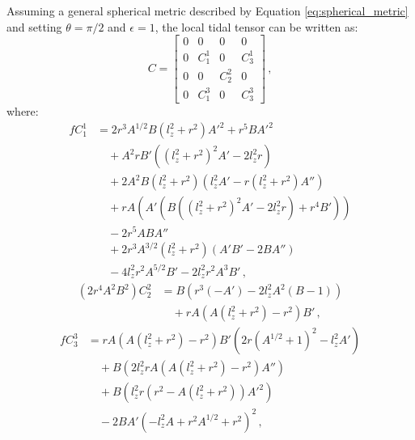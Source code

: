 \documentclass[11pt, twocolumn]{article}
\begin{document}
Assuming a general spherical metric described by Equation \ref{eq:spherical_metric} and setting $\theta = \pi/2$ and $\epsilon = 1$, the local tidal tensor can be written as:
\begin{equation}
    C =
    \begin{bmatrix}
        0 & 0         & 0         & 0         \\
        0 & C^{1}_{1} & 0         & C^{1}_{3} \\
        0 & 0         & C^{2}_{2} & 0         \\
        0 & C^{3}_{1} & 0         & C^{3}_{3}
    \end{bmatrix} \, ,
\end{equation}
where:
\begin{equation}
    \begin{split}
        f C^{1}_{1} &= 2 r^{3} A^{1/2} B \left( l_{z}^{2} + r^{2} \right) A'^{2} + r^5 B A'^{2} \\
        &\quad+ A^{2} r B' \left( \left( l_{z}^{2} + r^{2} \right)^{2} A'-2 l_{z}^{2} r \right) \\
        &\quad+ 2A^{2} B \left( l_{z}^{2} + r^{2} \right) \left( l_{z}^{2} A'-r \left( l_{z}^{2} + r^{2} \right) A'' \right) \\
        &\quad+ r A \left( A' \left( B \left( \left( l_{z}^{2} + r^{2} \right)^{2} A'-2 l_{z}^{2} r \right) + r^{4} B' \right) \right) \\
        &\quad-2 r^{5} A B A'' \\
        &\quad+ 2 r^{3} A^{3/2} \left( l_{z}^{2} + r^{2} \right) \left( A' B'-2 B A'' \right) \\
        &\quad-4 l_{z}^{2} r^{2} A^{5/2} B'-2 l_{z}^{2} r^{2} A^{3} B' \, ,
    \end{split}
\end{equation}
\begin{equation}
    \begin{split}
        (2 r^{4} A^{2} B^{2}) C^{2}_{2} &= B \left( r^3 \left( -A' \right)-2 l_{z}^{2} A^{2} (B-1) \right) \\
        &\quad+r A \left( A \left( l_{z}^{2}+r^{2} \right)-r^{2} \right) B' \, ,
    \end{split}
\end{equation}
\begin{equation}
    \begin{split}
        f C^{3}_{3} &= r A \left( A \left( l_{z}^{2}+r^{2} \right)-r^{2}\right) B' \left( 2 r ( A^{1/2} +1 )^{2}-l_{z}^{2} A'\right) \\
        &\quad+B \left( 2 l_{z}^{2} r A \left( A \left( l_{z}^{2}+r^{2} \right)-r^{2} \right) A'' \right) \\
        &\quad+B \left( l_{z}^{2} r \left( r^{2}-A \left( l_{z}^{2}+r^{2} \right) \right) A'^{2} \right) \\
        &\quad-2BA' \left( -l_{z}^{2} A+r^{2} A^{1/2} +r^{2} \right)^{2} \, ,
    \end{split}
\end{equation}
\end{document}
